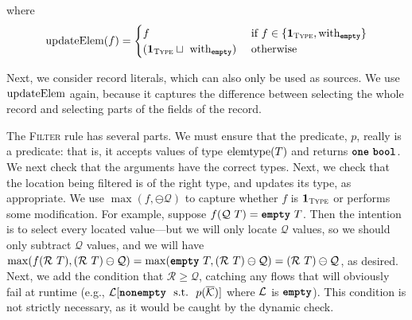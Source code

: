 \documentclass[nonacm, dvipsnames, sigconf]{acmart}
\begin{document}
where
\[
    \updateElem(f) =
    \begin{cases}
        f & \tif f \in \curlys{\id{\types}, \with_{\emptyq}} \\
        (\id{\types} \sqcup~\with_{\emptyq}) & \owise
    \end{cases}
\]

Next, we consider record literals, which can also only be used as sources.
We use $\updateElem$ again, because it captures the difference  between selecting the whole record and selecting parts of the fields of the record.
\begin{mathpar}
\end{mathpar}

The \textsc{Filter} rule has several parts.
We must ensure that the predicate, $p$, really is a predicate: that is, it accepts values of type $\elemtype(T)$ and returns $\exactlyone~\boolt$.
We next check that the arguments have the correct types.
Next, we check that the location being filtered is of the right type, and updates its type, as appropriate.
We use $\max(f, \ominus \mathcal{Q})$ to capture whether $f$ is $\id{\types}$ or performs some modification.
For example, suppose $f(\mathcal{Q}~T) = \emptyq~T$.
Then the intention is to select every located value---but we will only locate $\mathcal{Q}$ values, so we should only subtract $\mathcal{Q}$ values, and we will have $\max(f(\mathcal{R}~T), (\mathcal{R}~T) \ominus \mathcal{Q}) = \max(\emptyq~T, (\mathcal{R}~T) \ominus \mathcal{Q}) = (\mathcal{R}~T) \ominus \mathcal{Q}$, as desired.
Next, we add the condition that $\mathcal{R} \geq \mathcal{Q}$, catching any flows that will obviously fail at runtime (e.g., $\Loc[\nonempty~\tsuchthat~p(\overline{\LocK})]$ where $\Loc$ is $\emptyq$).
This condition is not strictly necessary, as it would be caught by the dynamic check.
\begin{mathpar}
\end{mathpar}
\end{document}
